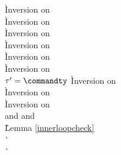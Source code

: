 \begin{description}
  \begin{tabbing}
    \` Inversion on  \\
    \` Inversion on  \\
    \` Inversion on  \\
    \` Inversion on  \\
    \` Inversion on  \\
    \` Inversion on  \\
  $\tau' = \commandty$
    \` Inversion on  \\
    \` Inversion on  \\
    \` Inversion on  \\
   and  and \\
    \` Lemma \ref{innerloopcheck} \\
    \`  \\
    \`  \\
  \end{tabbing}


\end{description}
